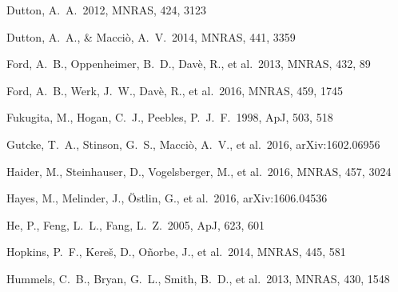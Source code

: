 \documentclass[useAMS,usenatbib]{mn2e}
\def \apj {ApJ}
\def \mnras {MNRAS}
\begin{document}
\begin{thebibliography}{}
 Dutton, A.~A.\ 2012,
  \mnras, 424, 3123
  
 Dutton,
  A.~A., \& Macci{\`o}, A.~V.\ 2014, \mnras, 441, 3359 



    

%
 Ford, A.~B., Oppenheimer, B.~D., Dav{\`e}, R., et al.\ 2013, \mnras, 432, 89

%
 Ford, A.~B., Werk, J.~W., Dav{\`e}, R., et al.\ 2016, \mnras, 459, 1745

 Fukugita, M., Hogan, C.~J., Peebles, P.~J.~F.\ 1998, \apj, 503, 518


 Gutcke, T.~A., Stinson, G.~S., Macci{\`o}, A.~V., et al.\ 2016, arXiv:1602.06956



Haider, M., Steinhauser, D., Vogelsberger, M., et al.\ 2016, \mnras, 457, 3024

Hayes, M., Melinder, J., {\"O}stlin, G., et al.\ 2016, arXiv:1606.04536

He, P., Feng, L.~L., Fang, L.~Z.\ 2005, \apj, 623, 601

 Hopkins, P.~F., Kere{\v s}, D., O{\~n}orbe, J., et al.\ 2014, \mnras, 445, 581 

%
 Hummels, C.~B., Bryan, G.~L., Smith, B.~D., et al.\ 2013, \mnras, 430, 1548


\end{thebibliography}
\end{document}

